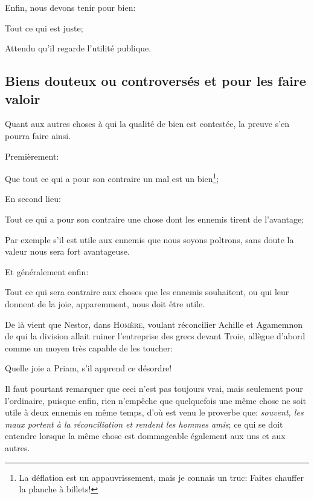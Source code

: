 \bigbreak

Enfin, nous devons tenir pour bien:

\begin{lieu}
	Tout ce qui est juste;
\end{lieu}

Attendu qu'il regarde l'utilité publique.

\subsection{Biens douteux ou controversés et pour les faire valoir}

Quant aux autres choses à qui la qualité de bien est contestée, la preuve s'en pourra faire ainsi.

\bigbreak

Premièrement:

\begin{lieu}
	Que tout ce qui a pour son contraire un mal est un bien\footnote{La déflation est un appauvrissement, mais je
	connais un truc: Faites chauffer la planche à billets!};
\end{lieu}

En second lieu:

\begin{lieu}
	Tout ce qui a pour son contraire une chose dont les ennemis tirent de l'avantage;
\end{lieu}

Par exemple s'il est utile aux ennemis que nous soyons poltrons, sans doute la valeur nous sera fort avantageuse.

Et généralement enfin:

\begin{lieu}
	Tout ce qui sera contraire aux choses que les ennemis souhaitent, ou qui leur donnent de la joie, apparemment,
	nous doit être utile.
\end{lieu}

De là vient que Nestor, dans \textsc{Homère}, voulant réconcilier Achille et Agamemnon de qui la division allait ruiner
l'entreprise des grecs devant Troie, allègue d'abord comme un moyen très capable de les toucher:

\begin{emphpar}
	Quelle joie a Priam, s'il apprend ce désordre!
\end{emphpar}

Il faut pourtant remarquer que ceci n'est pas toujours vrai, mais seulement pour l'ordinaire, puisque enfin, rien
n'empêche que quelquefois une même chose ne soit utile à deux ennemis en même temps, d'où est venu le proverbe que:
\emph{souvent, les maux portent à la réconciliation et rendent les hommes amis}; ce qui se doit entendre lorsque la
même chose est dommageable également aux uns et aux autres.

